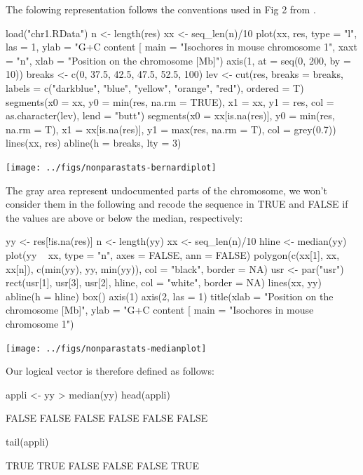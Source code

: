 \documentclass{article}
\begin{document}
The folowing representation follows the conventions used in Fig 2 from \cite{PacesJ2004}.

\begin{Schunk}
\begin{Sinput}
 load("chr1.RData")
 n <- length(res)
 xx <- seq_len(n)/10
 plot(xx, res, type = "l", las = 1, ylab = "G+C content [%
     main = "Isochores in mouse chromosome 1", xaxt = "n", 
     xlab = "Position on the chromosome [Mb]")
 axis(1, at = seq(0, 200, by = 10))
 breaks <- c(0, 37.5, 42.5, 47.5, 52.5, 100)
 lev <- cut(res, breaks = breaks, labels = c("darkblue", "blue", 
     "yellow", "orange", "red"), ordered = T)
 segments(x0 = xx, y0 = min(res, na.rm = TRUE), x1 = xx, y1 = res, 
     col = as.character(lev), lend = "butt")
 segments(x0 = xx[is.na(res)], y0 = min(res, na.rm = T), x1 = xx[is.na(res)], 
     y1 = max(res, na.rm = T), col = grey(0.7))
 lines(xx, res)
 abline(h = breaks, lty = 3)
\end{Sinput}
\end{Schunk}
\texttt{[image: ../figs/nonparastats-bernardiplot]}

The gray area represent undocumented parts of the chromosome, we won't
consider them in the following and recode the sequence in TRUE and FALSE
if the values are above or below the median, respectively:

\begin{Schunk}
\begin{Sinput}
 yy <- res[!is.na(res)]
 n <- length(yy)
 xx <- seq_len(n)/10
 hline <- median(yy)
 plot(yy ~ xx, type = "n", axes = FALSE, ann = FALSE)
 polygon(c(xx[1], xx, xx[n]), c(min(yy), yy, min(yy)), col = "black", 
     border = NA)
 usr <- par("usr")
 rect(usr[1], usr[3], usr[2], hline, col = "white", border = NA)
 lines(xx, yy)
 abline(h = hline)
 box()
 axis(1)
 axis(2, las = 1)
 title(xlab = "Position on the chromosome [Mb]", ylab = "G+C content [%
     main = "Isochores in mouse chromosome 1")
\end{Sinput}
\end{Schunk}
\texttt{[image: ../figs/nonparastats-medianplot]}

Our logical vector is therefore defined as follows:

\begin{Schunk}
\begin{Sinput}
 appli <- yy > median(yy)
 head(appli)
\end{Sinput}
\begin{Soutput}
[1] FALSE FALSE FALSE FALSE FALSE FALSE
\end{Soutput}
\begin{Sinput}
 tail(appli)
\end{Sinput}
\begin{Soutput}
[1]  TRUE  TRUE FALSE FALSE FALSE  TRUE
\end{Soutput}
\end{Schunk}
\end{document}
